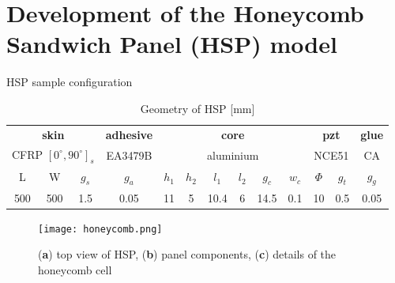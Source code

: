 \documentclass[10pt,aspectratio=169]{beamer} %
\begin{document}
\section{Development of the Honeycomb Sandwich Panel (HSP) model}
\begin{frame}[label=frame7]{HSP sample configuration}
\begin{table}
	\centering \scriptsize
	\caption{Geometry of HSP [mm]}
	\begin{tabular}{ccccccccccccc} 
		\toprule
		\multicolumn{3}{c}{\textbf{skin}} & {\textbf{adhesive}} & \multicolumn{6}{c}{\textbf{core}} & \multicolumn{2}{c}{\textbf{pzt}} & {\textbf{glue}}\\
		\multicolumn{3}{c}{CFRP $[0^\circ,90^\circ]_s$} & {EA3479B} & \multicolumn{6}{c}{aluminium} & \multicolumn{2}{c}{NCE51} & {CA}\\ 
		\cmidrule(lr){1-3} \cmidrule(lr){4-4} \cmidrule(lr){5-10} \cmidrule(lr){11-12} \cmidrule(lr){13-13}
		L & W & $g_s$ & $g_a$ & $h_1$ & $h_2$ & $l_1$ & $l_2$ & $g_c$ & $w_c$ & $\Phi$ & $g_t$ & $g_g$\\ 
		\cmidrule(lr){1-3} \cmidrule(lr){4-4} \cmidrule(lr){5-10} \cmidrule(lr){11-12} \cmidrule(lr){13-13}
		500 & 500 & 1.5 & 0.05 & 11 & 5 & 10.4 & 6 & 14.5 & 0.1 & 10 & 0.5 & 0.05\\
		\bottomrule 
	\end{tabular} 
	\label{tab:panel_geo}
\end{table}
	\begin{figure}
	\texttt{[image: honeycomb.png]}
	\caption{(\textbf{a}) top view of HSP, (\textbf{b}) panel components, (\textbf{c}) details of the honeycomb cell}
	\end{figure}
\end{frame}
\end{document}
